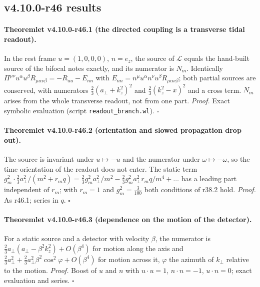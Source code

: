 \subsection*{v4.10.0-r46 results}
\label{subsec:v4100-r46-results}

\paragraph{Theoremlet v4.10.0-r46.1 (the directed coupling is a transverse tidal readout).}
In the rest frame \(u=(1,0,0,0)\), \(n=e_z\), the source of \(\mathcal L\) equals the hand-built source of the bifocal notes exactly, and its numerator is \(N_m\).
Identically \(\Pi^{\mu\nu}u^\alpha u^\beta R_{\mu\alpha\nu\beta}=-R_{uu}-E_{nn}\) with \(E_{nn}=n^\mu u^\alpha n^\nu u^\beta R_{\mu\alpha\nu\beta}\); both partial sources are conserved, with numerators
\(\tfrac23(a_\perp+k_z^2)^2\) and \(\tfrac23(k_z^2-x)^2\) and a cross term.  \(N_m\) arises from the whole transverse readout, not from one part.
\emph{Proof.} Exact symbolic evaluation (script \texttt{readout\_\allowbreak branch.wl}).  \(\square\)

\paragraph{Theoremlet v4.10.0-r46.2 (orientation and slowed propagation drop out).}
The source is invariant under \(u\mapsto-u\) and the numerator under \(\omega\mapsto-\omega\), so the time orientation of the readout does not enter.  The static
term \(g_m^2\cdot\tfrac23a_\perp^2/(m^2+r_mq)=\tfrac23g_m^2a_\perp^2/m^2-\tfrac23g_m^2a_\perp^2r_mq/m^4+\dots\) has a leading part independent of \(r_m\); with \(r_m=1\) and
\(g_m^2=\tfrac3{100}\) both conditions of r38.2 hold.
\emph{Proof.} As r46.1; series in \(q\).  \(\square\)

\paragraph{Theoremlet v4.10.0-r46.3 (dependence on the motion of the detector).}
For a static source and a detector with velocity \(\beta\), the numerator is \(\tfrac23a_\perp(a_\perp-\beta^2k_z^2)+O(\beta^4)\) for motion along the axis and
\(\tfrac23a_\perp^2+\tfrac23a_\perp^2\beta^2\cos^2\varphi+O(\beta^4)\) for motion across it, \(\varphi\) the azimuth of \(k_\perp\) relative to the motion.
\emph{Proof.} Boost of \(u\) and \(n\) with \(u\cdot u=1\), \(n\cdot n=-1\), \(u\cdot n=0\); exact evaluation and series.  \(\square\)

